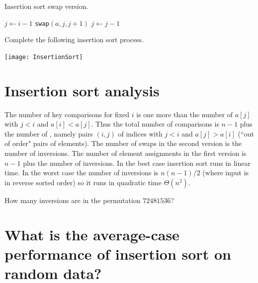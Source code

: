 \begin{algorithm}[H]
  \caption{Insertion sort swap version.}
    \label{alg:insort2}
\begin{algorithmic}[1]
		\State $j \gets i - 1$
			\State {}
			\State \texttt{swap}$(a,j,j+1)$
			\State $j \gets j - 1$
		\EndWhile
	\EndFor
	\State {}
\EndFunction  
\end{algorithmic}
\end{algorithm}

\begin{Boxample}[0]
Complete the following insertion sort process.
\begin{center}
\texttt{[image: InsertionSort]}
\end{center}
\end{Boxample}


\section{Insertion sort analysis}
The number of key comparisons for fixed $i$ is one more than the number of $a[j]$ with $j < i$ and $a[i] < a[j]$.
Thus the total number of comparisons is $n-1$ plus the number of , 
namely pairs $(i, j)$ of indices with $j < i$ and $a[j] > a[i]$ (``out of order" pairs of elements).
The number of swaps in the second version is the number of inversions. 
The number of element assignments in the first version is $n-1$ plus the number of inversions.
In the best case insertion sort runs in linear time. 
In the worst case the number of inversions is $n(n-1)/2$ 
(where input is in reverse sorted order) so it runs in quadratic time $\Theta(n^2)$.

\begin{Boxample}[4]
How many inversions are in the permutation $72481536$?
\end{Boxample}

\section{What is the average-case performance of insertion sort on random data?}

